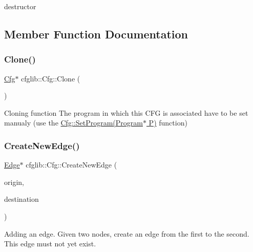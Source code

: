 destructor 

\subsection{Member Function Documentation}
\mbox{\label{classcfglib_1_1Cfg_a87e8932c31bd9747af7eafc92b6d749b}} 
\subsubsection{\texorpdfstring{Clone()}{Clone()}}
{\footnotesize\ttfamily \hyperlink{classcfglib_1_1Cfg}{Cfg}$\ast$ cfglib\+::\+Cfg\+::\+Clone (\begin{DoxyParamCaption}\item[{\hyperlink{classcfglib_1_1CloneHandle}{Clone\+Handle} \&}]{ }\end{DoxyParamCaption})}

Cloning function The program in which this C\+FG is associated have to be set manualy (use the \hyperlink{classcfglib_1_1Cfg_a6408b372beac5ab2eaa02dbea18ca23c}{Cfg\+::\+Set\+Program(\+Program$\ast$ P)} function) \mbox{\label{classcfglib_1_1Cfg_aa3e584ba98c948fe9cb31cbd9ba30215}} 
\subsubsection{\texorpdfstring{Create\+New\+Edge()}{CreateNewEdge()}}
{\footnotesize\ttfamily \hyperlink{classcfglib_1_1Edge}{Edge}$\ast$ cfglib\+::\+Cfg\+::\+Create\+New\+Edge (\begin{DoxyParamCaption}\item[{\hyperlink{classcfglib_1_1Node}{Node} $\ast$}]{origin,  }\item[{\hyperlink{classcfglib_1_1Node}{Node} $\ast$}]{destination }\end{DoxyParamCaption})}

Adding an edge. Given two nodes, create an edge from the first to the second. This edge must not yet exist. \mbox{\label{classcfglib_1_1Cfg_a5c751a3e53b10ecdae556b2936e5303c}} 
